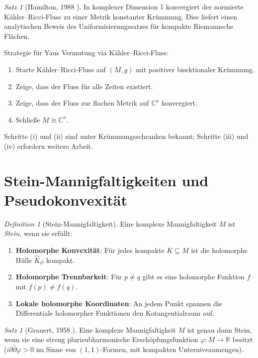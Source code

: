 \documentclass[12pt,a4paper]{amsart}
\theoremstyle{definition}
\theoremstyle{remark}
\newtheorem{satz}[theorem]{Satz}
\newtheorem{definition_de}[theorem]{Definition}
\newcommand{\CC}{\mathbb{C}}
\newcommand{\RR}{\mathbb{R}}
\newcommand{\dd}{\partial}
\newcommand{\OO}{\mathcal{O}}
\begin{document}
\begin{satz}[Hamilton, 1988 \cite{Hamilton1988}]
In komplexer Dimension 1 konvergiert der normierte Kähler--Ricci-Fluss zu
einer Metrik konstanter Krümmung.  Dies liefert einen analytischen Beweis
des Uniformisierungssatzes für kompakte Riemannsche Flächen.
\end{satz}

Strategie für Yaus Vermutung via Kähler--Ricci-Fluss:
\begin{enumerate}[label=(\roman*)]
  \item Starte Kähler--Ricci-Fluss auf $(M,g)$ mit positiver bisektionaler Krümmung.
  \item Zeige, dass der Fluss für alle Zeiten existiert.
  \item Zeige, dass der Fluss zur flachen Metrik auf $\CC^n$ konvergiert.
  \item Schließe $M \cong \CC^n$.
\end{enumerate}
Schritte (i) und (ii) sind unter Krümmungsschranken bekannt;
Schritte (iii) und (iv) erfordern weitere Arbeit.

\section{Stein-Mannigfaltigkeiten und Pseudokonvexität}

\begin{definition_de}[Stein-Mannigfaltigkeit]
Eine komplexe Mannigfaltigkeit $M$ ist \emph{Stein}, wenn sie erfüllt:
\begin{enumerate}[label=(\roman*)]
  \item \textbf{Holomorphe Konvexität}: Für jedes kompakte $K \subseteq M$
        ist die holomorphe Hülle $\hat K_\OO$ kompakt.
  \item \textbf{Holomorphe Trennbarkeit}: Für $p \neq q$ gibt es eine
        holomorphe Funktion $f$ mit $f(p) \neq f(q)$.
  \item \textbf{Lokale holomorphe Koordinaten}: An jedem Punkt spannen
        die Differentiale holomorpher Funktionen den Kotangentialraum auf.
\end{enumerate}
\end{definition_de}

\begin{satz}[Grauert, 1958 \cite{Grauert1958}]
Eine komplexe Mannigfaltigkeit $M$ ist genau dann Stein, wenn sie eine
streng plurisubharmonische Erschöpfungsfunktion
$\varphi \colon M \to \RR$ besitzt ($i\dd\bar\dd\varphi > 0$ im Sinne
von $(1,1)$-Formen, mit kompakten Unterniveaumengen).
\end{satz}
\end{document}
